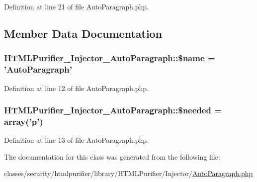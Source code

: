 Definition at line 21 of file Auto\+Paragraph.\+php.



\subsection{Member Data Documentation}
\hypertarget{classHTMLPurifier__Injector__AutoParagraph_a003bc6d4f2f794a6ca7f5288a751c260}{
\subsubsection[{\$name}]{\setlength{\rightskip}{0pt plus 5cm}H\+T\+M\+L\+Purifier\+\_\+\+Injector\+\_\+\+Auto\+Paragraph\+::\$name = 'Auto\+Paragraph'}}\label{classHTMLPurifier__Injector__AutoParagraph_a003bc6d4f2f794a6ca7f5288a751c260}


Definition at line 12 of file Auto\+Paragraph.\+php.

\hypertarget{classHTMLPurifier__Injector__AutoParagraph_a3acffb72b8e8141e174efeff7dd2f5d2}{
\subsubsection[{\$needed}]{\setlength{\rightskip}{0pt plus 5cm}H\+T\+M\+L\+Purifier\+\_\+\+Injector\+\_\+\+Auto\+Paragraph\+::\$needed = array('p')}}\label{classHTMLPurifier__Injector__AutoParagraph_a3acffb72b8e8141e174efeff7dd2f5d2}


Definition at line 13 of file Auto\+Paragraph.\+php.



The documentation for this class was generated from the following file\+:\begin{DoxyCompactItemize}
\item 
classes/security/htmlpurifier/library/\+H\+T\+M\+L\+Purifier/\+Injector/\hyperlink{AutoParagraph_8php}{Auto\+Paragraph.\+php}\end{DoxyCompactItemize}
